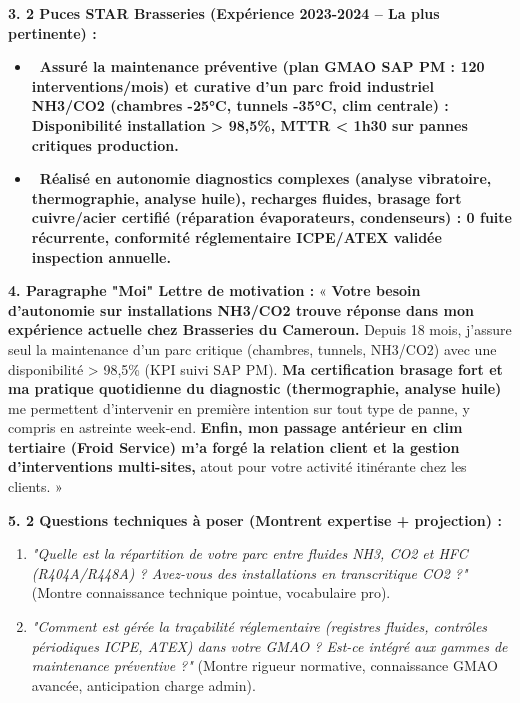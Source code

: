 \documentclass[11pt]{article}
\begin{document}
\begin{exoresolu}
\textbf{3. 2 Puces STAR Brasseries (Expérience 2023-2024 -- La plus pertinente) :}
\begin{itemize}
    \item \textbf{\textbullet\ Assuré la maintenance préventive (plan GMAO SAP PM : 120 interventions/mois) et curative d'un parc froid industriel NH3/CO2 (chambres -25°C, tunnels -35°C, clim centrale) : \textbf{Disponibilité installation > 98,5\%}, \textbf{MTTR < 1h30} sur pannes critiques production.}
    \item \textbf{\textbullet\ Réalisé en autonomie diagnostics complexes (analyse vibratoire, thermographie, analyse huile), recharges fluides, \textbf{brasage fort cuivre/acier certifié} (réparation évaporateurs, condenseurs) : \textbf{0 fuite récurrente}, \textbf{conformité réglementaire ICPE/ATEX} validée inspection annuelle.}
\end{itemize}

\textbf{4. Paragraphe "Moi" Lettre de motivation :}
« \textbf{Votre besoin d'autonomie sur installations NH3/CO2 trouve réponse dans mon expérience actuelle chez Brasseries du Cameroun.} Depuis 18 mois, j'assure seul la maintenance d'un parc critique (chambres, tunnels, NH3/CO2) avec une disponibilité > 98,5\% (KPI suivi SAP PM). \textbf{Ma certification brasage fort et ma pratique quotidienne du diagnostic (thermographie, analyse huile)} me permettent d'intervenir en première intention sur tout type de panne, y compris en astreinte week-end. \textbf{Enfin, mon passage antérieur en clim tertiaire (Froid Service) m'a forgé la relation client et la gestion d'interventions multi-sites,} atout pour votre activité itinérante chez les clients. »

\textbf{5. 2 Questions techniques à poser (Montrent expertise + projection) :}
\begin{enumerate}
    \item \emph{"Quelle est la répartition de votre parc entre fluides NH3, CO2 et HFC (R404A/R448A) ? Avez-vous des installations en transcritique CO2 ?"} (Montre connaissance technique pointue, vocabulaire pro).
    \item \emph{"Comment est gérée la traçabilité réglementaire (registres fluides, contrôles périodiques ICPE, ATEX) dans votre GMAO ? Est-ce intégré aux gammes de maintenance préventive ?"} (Montre rigueur normative, connaissance GMAO avancée, anticipation charge admin).
\end{enumerate}
\end{exoresolu}
\end{document}
